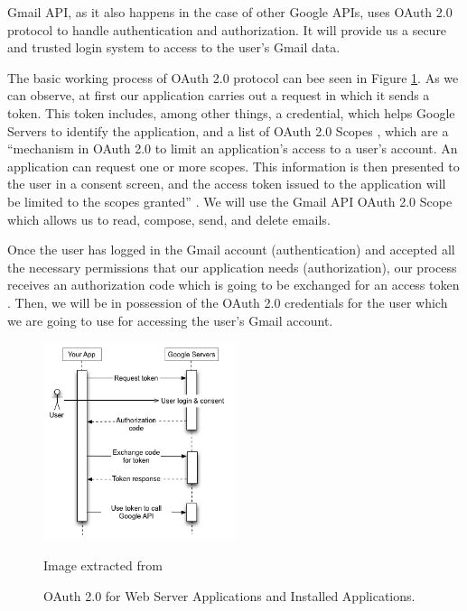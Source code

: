 Gmail API, as it also happens in the case of other Google APIs, uses OAuth 2.0 protocol \citep{oauthforgoogle} to handle authentication and authorization. It will provide us a secure and trusted login system to access to the user's Gmail data.

The basic working process of OAuth 2.0 protocol can bee seen in Figure \ref{fig:oauth}. As we can observe, at first our application carries out a request in which it sends a token. This token includes, among other things, a credential, which helps Google Servers  to identify the application, and a list of OAuth 2.0 Scopes \citep{oauth-scopes-google}, which are a ``mechanism  in OAuth 2.0 to limit an application's access to a user's account. An application can request one or more scopes. This information is then presented to the user in a consent screen, and the access token issued to the application will be limited to the scopes granted'' \citep{oauth-scopes}. We will use the Gmail API OAuth 2.0 Scope which allows us to read, compose, send, and delete emails.

Once the user has logged in the Gmail account (authentication) and accepted all the necessary permissions that our application needs (authorization), our process receives an authorization code which is going to be exchanged for an access token \citep{oauth-exchange}. Then, we will be in possession of the OAuth 2.0 credentials for the user \citep{oauth2.credentials} which we are going to use for accessing the user's Gmail account.

\begin{figure}[h]
	\centering%
	\includegraphics[width = 0.5\textwidth]{Imagenes/Bitmap/webflow.png}%
	\caption{OAuth 2.0 for Web Server Applications and Installed Applications.}%
	Image extracted from \cite{oauthforgoogle}
	\label{fig:oauth}
\end{figure}

